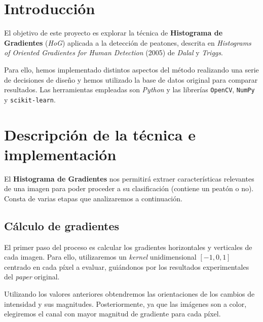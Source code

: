 \documentclass[11pt,a4paper]{article}
\begin{document}
    \tableofcontents
    \listoffigures

\newpage

    \section{Introducción}

        \par
        El objetivo de este proyecto es explorar la técnica de \textbf{Histograma de Gradientes} (\textit{HoG}) aplicada a la detección de peatones, descrita en \textit{Histograms of Oriented Gradientes for Human Detection} (2005) de \textit{Dalal} y \textit{Triggs}.

        \par
        Para ello, hemos implementado distintos aspectos del método realizando una serie de decisiones de diseño y hemos utilizado la base de datos original para comparar resultados. Las herramientas empleadas son \textit{Python} y las librerías \texttt{OpenCV}, \texttt{NumPy} y \texttt{scikit-learn}.

    \section{Descripción de la técnica e implementación}

        \par
        El \textbf{Histograma de Gradientes} nos permitirá extraer características relevantes de una imagen para poder proceder a su clasificación (contiene un peatón o no). Consta de varias etapas que analizaremos a continuación.

        \subsection{Cálculo de gradientes}

            \par
            El primer paso del proceso es calcular los gradientes horizontales y verticales de cada imagen. Para ello, utilizaremos un \textit{kernel} unidimensional $\left[-1,0,1\right]$ centrado en cada píxel a evaluar, guiándonos por los resultados experimentales del \textit{paper} original.

            \par
            Utilizando los valores anteriores obtendremos las orientaciones de los cambios de intensidad y sus magnitudes. Posteriormente, ya que las imágenes son a color, elegiremos el canal con mayor magnitud de gradiente para cada píxel.
\end{document}
